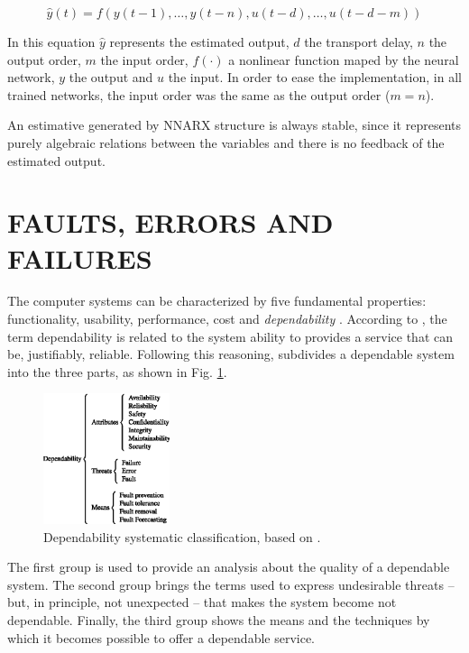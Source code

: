 \documentclass[10pt,fleqn,a4paper]{article}
\newcommand{\parent}[1]{\left(#1\right)}
\begin{document}
\begin{equation}
\label{eq:nnarx}
\hat{y}(t) = f\parent{y(t-1), \ldots, y(t-n), u(t-d), \ldots, u(t-d-m)}
\end{equation}

In this equation $\hat{y}$ represents the estimated output, $d$ the transport
delay, $n$ the output order, $m$ the input order, $f(\cdotp)$ a nonlinear
function maped by the neural network, $y$ the output and $u$ the input. In order
to ease the implementation, in all trained networks, the input order was the
same as the output order ($m = n$).

An estimative generated by NNARX structure is always stable, since it represents
purely algebraic relations between the variables and there is no feedback of the
estimated output.

\section{FAULTS, ERRORS AND FAILURES}\label{sec:eff}
The computer systems can be characterized by five fundamental properties:
functionality, usability, performance, cost and {\it dependability}
\citep{kaaniche:2002}. According to \citet{laprie:1992}, the term dependability
is related to the system ability to provides a service that can be, justifiably,
reliable. Following this reasoning, \citet{avizienis:2000} subdivides a
dependable system into the three parts, as shown in Fig.
\ref{fig:div_avizienis}.

\begin{figure}[htb]
\centering
    \includegraphics[width=0.33\textwidth]{imgs/div_avizienis}
    \caption{Dependability systematic classification, based on
             \citet{avizienis:2000}.}
    \label{fig:div_avizienis}
\end{figure}

The first group is used to provide an analysis about the quality of a dependable
system. The second group brings the terms used to express undesirable threats --
but, in principle, not unexpected -- that makes the system become not dependable.
Finally, the third group shows the means and the techniques by which it becomes
possible to offer a dependable service.
\end{document}
